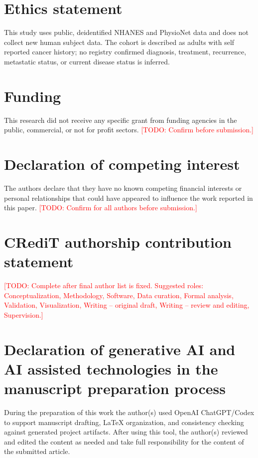 \documentclass[final,5p,times,twocolumn]{elsarticle}
\newcommand{\todo}[1]{\textcolor{red}{[TODO: #1]}}
\begin{document}
\section*{Ethics statement}

This study uses public, deidentified NHANES and PhysioNet data and does not collect new human subject data. The cohort is described as adults with self reported cancer history; no registry confirmed diagnosis, treatment, recurrence, metastatic status, or current disease status is inferred.

\section*{Funding}

This research did not receive any specific grant from funding agencies in the public, commercial, or not for profit sectors. \todo{Confirm before submission.}

\section*{Declaration of competing interest}

The authors declare that they have no known competing financial interests or personal relationships that could have appeared to influence the work reported in this paper. \todo{Confirm for all authors before submission.}

\section*{CRediT authorship contribution statement}

\todo{Complete after final author list is fixed. Suggested roles: Conceptualization, Methodology, Software, Data curation, Formal analysis, Validation, Visualization, Writing -- original draft, Writing -- review and editing, Supervision.}

\section*{Declaration of generative AI and AI assisted technologies in the manuscript preparation process}

During the preparation of this work the author(s) used OpenAI ChatGPT/Codex to support manuscript drafting, LaTeX organization, and consistency checking against generated project artifacts. After using this tool, the author(s) reviewed and edited the content as needed and take full responsibility for the content of the submitted article.
\end{document}
